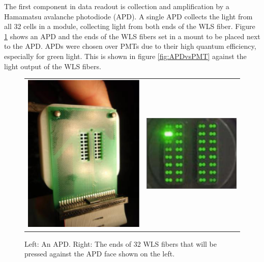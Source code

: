 The first component in data readout is collection and amplification by a Hamamatsu avalanche photodiode (APD). A single APD collects the light from all 32 cells in a module, collecting light from both ends of the WLS fiber. Figure \ref{fig:DetAPD} shows an APD and the ends of the WLS fibers set in a mount to be placed next to the APD. APDs were chosen over PMTs due to their high quantum efficiency, especially for green light. This is shown in figure \ref{fig:APDvsPMT} against the light output of the WLS fibers.
\begin{figure}[htb]
  \centering
  \begin{tabular}{c c}
    \includegraphics[width=.47\textwidth]{figures/DetAPD.png} &
    \includegraphics[width=.47\textwidth]{figures/DetFiberEnd.png} \\
  \end{tabular}
  \caption[An APD]{Left: An APD. Right: The ends of 32 WLS fibers that will be pressed against the APD face shown on the left.}
  \label{fig:DetAPD}
\end{figure}

